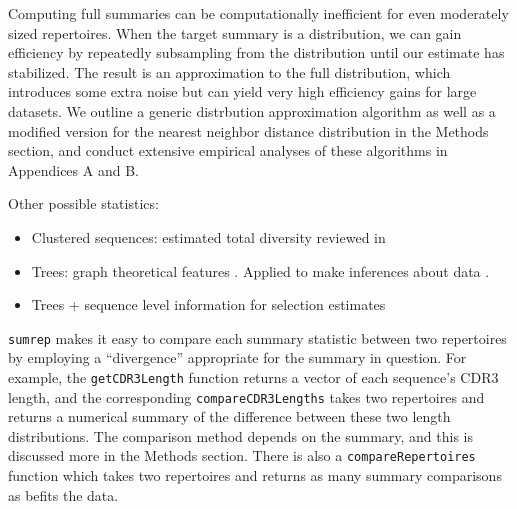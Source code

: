 \documentclass{article}
\begin{document}
Computing full summaries can be computationally inefficient for even moderately sized repertoires.
When the target summary is a distribution, we can gain efficiency by repeatedly subsampling from the distribution until our estimate has stabilized.
The result is an approximation to the full distribution, which introduces some  extra noise but can yield very high efficiency gains for large datasets.
We outline a generic distrbution approximation algorithm as well as a modified version for the nearest neighbor distance distribution in the Methods section, and conduct extensive empirical analyses of these algorithms in Appendices A and B.

Other possible statistics:

\begin{itemize}
\item Clustered sequences: estimated total diversity reviewed in \cite{Mehr2012-se}
\item Trees: graph theoretical features \cite{Dunn-Walters2002-cu,Dunn-Walters2004-hv,Mehr2004-ej,Shahaf2008-cc,Budeus2015-ab,Yaari2015-ss}.
Applied to make inferences about data \cite{Steiman-Shimony2006-fm}.
\item Trees + sequence level information for selection estimates \cite{Uduman2014-pb}
\end{itemize}

\texttt{sumrep} makes it easy to compare each summary statistic between two repertoires by employing a ``divergence'' appropriate for the summary in question.
For example, the \texttt{getCDR3Length} function returns a vector of each sequence's CDR3 length, and the corresponding \texttt{compareCDR3Lengths} takes two repertoires and returns a numerical summary of the difference between these two length distributions.
The comparison method depends on the summary, and this is discussed more in the Methods section.
There is also a \texttt{compareRepertoires} function which takes two repertoires and returns as many summary comparisons as befits the data.
\end{document}
